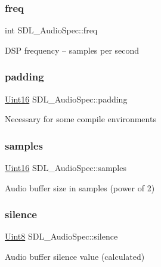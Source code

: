 \subsubsection{\texorpdfstring{freq}{freq}}
{\footnotesize\ttfamily int S\+D\+L\+\_\+\+Audio\+Spec\+::freq}

D\+SP frequency -- samples per second \mbox{\label{struct_s_d_l___audio_spec_a738371fc13b54cefef4db16994abeeb6}} 
\subsubsection{\texorpdfstring{padding}{padding}}
{\footnotesize\ttfamily \hyperlink{_s_d_l__stdinc_8h_a31fcc0a076c9068668173ee26d33e42b}{Uint16} S\+D\+L\+\_\+\+Audio\+Spec\+::padding}

Necessary for some compile environments \mbox{\label{struct_s_d_l___audio_spec_a2cdf5e885808c10bfa2810b706e69f95}} 
\subsubsection{\texorpdfstring{samples}{samples}}
{\footnotesize\ttfamily \hyperlink{_s_d_l__stdinc_8h_a31fcc0a076c9068668173ee26d33e42b}{Uint16} S\+D\+L\+\_\+\+Audio\+Spec\+::samples}

Audio buffer size in samples (power of 2) \mbox{\label{struct_s_d_l___audio_spec_addc462c8a806e6c122eccf63482048f6}} 
\subsubsection{\texorpdfstring{silence}{silence}}
{\footnotesize\ttfamily \hyperlink{_s_d_l__stdinc_8h_a2944638813a090aa23e62f4da842c3e2}{Uint8} S\+D\+L\+\_\+\+Audio\+Spec\+::silence}

Audio buffer silence value (calculated) \mbox{\label{struct_s_d_l___audio_spec_a154cf44743ecec78c36dc6c827dd2fdb}} 
